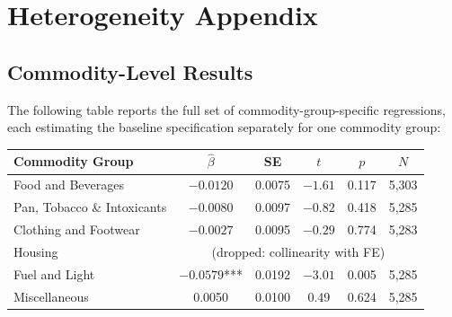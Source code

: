 \documentclass[12pt]{article}
\begin{document}
\section{Heterogeneity Appendix}\label{app:heterogeneity}

\subsection{Commodity-Level Results}

The following table reports the full set of commodity-group-specific regressions, each estimating the baseline specification separately for one commodity group:

\begin{center}
\begin{tabular}{lccccc}
\toprule
Commodity Group & $\hat{\beta}$ & SE & $t$ & $p$ & $N$ \\
\midrule
Food and Beverages & $-0.0120$ & 0.0075 & $-1.61$ & 0.117 & 5,303 \\
Pan, Tobacco \& Intoxicants & $-0.0080$ & 0.0097 & $-0.82$ & 0.418 & 5,285 \\
Clothing and Footwear & $-0.0027$ & 0.0095 & $-0.29$ & 0.774 & 5,283 \\
Housing & \multicolumn{5}{c}{(dropped: collinearity with FE)} \\
Fuel and Light & $-0.0579$*** & 0.0192 & $-3.01$ & 0.005 & 5,285 \\
Miscellaneous & 0.0050 & 0.0100 & 0.49 & 0.624 & 5,285 \\
\bottomrule
\end{tabular}
\end{center}
\end{document}
